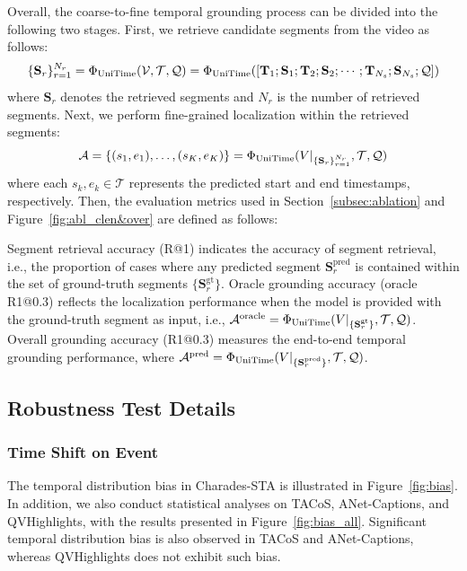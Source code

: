 Overall, the coarse-to-fine temporal grounding process can be divided into the following two stages.
First, we retrieve candidate segments from the video as follows:
\begin{equation*}
    \{\mathbf{S}_r\}_{r=1}^{N_r} = \Phi_{\text{{UniTime}{}}}(\mathcal{V}, \mathcal{T}, \mathcal{Q}) = \Phi_{\text{{UniTime}{}}}([\mathbf{T}_1;\mathbf{S}_1;\mathbf{T}_2;\mathbf{S}_2;\cdots;\mathbf{T}_{N_s};\mathbf{S}_{N_s};\mathcal{Q}])
\end{equation*}
where $\mathbf{S}_r$ denotes the retrieved segments and $N_r$ is the number of retrieved segments.
Next, we perform fine-grained localization within the retrieved segments:
\begin{equation*}
    \mathcal{A} = \{(s_1,e_1), \dots, (s_K,e_K)\} = \Phi_{\text{{UniTime}{}}}(V|_{\{\mathbf{S}_r\}_{r=1}^{N_r}}, \mathcal{T}, \mathcal{Q})
\end{equation*}
where each $s_k, e_k \in \mathcal{T}$ represents the predicted start and end timestamps, respectively.
Then, the evaluation metrics used in Section~\ref{subsec:ablation} and Figure~\ref{fig:abl_clen&over} are defined as follows:

{Segment retrieval accuracy (R@1)} indicates the accuracy of segment retrieval, i.e., the proportion of cases where any predicted segment $\mathbf{S}_r^{\text{pred}}$ is contained within the set of ground-truth segments $\{\mathbf{S}_r^{\text{gt}}\}$.
{Oracle grounding accuracy (oracle R1@0.3)} reflects the localization performance when the model is provided with the ground-truth segment as input, i.e., $\mathcal{A}^{\text{oracle}} = \Phi_{\text{{UniTime}{}}}(V|_{\{\mathbf{S}_r^{\text{gt}}\}}, \mathcal{T}, \mathcal{Q})$.
{Overall grounding accuracy (R1@0.3)} measures the end-to-end temporal grounding performance, where $\mathcal{A}^{\text{pred}} = \Phi_{\text{{UniTime}{}}}(V|_{\{\mathbf{S}_r^{\text{pred}}\}}, \mathcal{T}, \mathcal{Q})$.

\subsection{Robustness Test Details}
\label{sub:robustness}
\subsubsection{Time Shift on Event}
The temporal distribution bias in Charades-STA is illustrated in Figure~\ref{fig:bias}. In addition, we also conduct statistical analyses on TACoS, ANet-Captions, and QVHighlights, with the results presented in Figure~\ref{fig:bias_all}. Significant temporal distribution bias is also observed in TACoS and ANet-Captions, whereas QVHighlights does not exhibit such bias.

